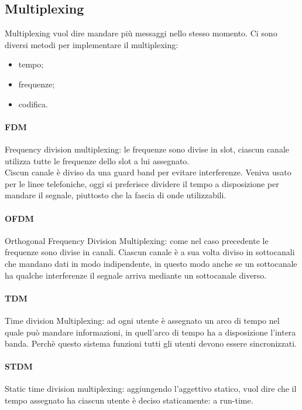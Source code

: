 \documentclass{article}
\begin{document}
\subsection{Multiplexing}
Multiplexing vuol dire mandare più messaggi nello stesso momento.
Ci sono diversi metodi per implementare il multiplexing:
\begin{itemize}
	\item tempo;
	\item frequenze;
	\item codifica.
\end{itemize}

\paragraph{FDM} Frequency division multiplexing: le frequenze sono divise in
slot, ciascun canale utilizza tutte le frequenze dello slot a lui assegnato.\\
Ciscun canale è diviso da una guard band per evitare interferenze. Veniva usato
per le linee telefoniche, oggi si preferisce dividere il tempo a disposizione
per mandare il segnale, piuttosto che la fascia di onde utilizzabili.

\paragraph{OFDM} Orthogonal Frequency Division Multiplexing: come nel caso
precedente le frequenze sono divise in canali. Ciascun canale è a sua volta
diviso in sottocanali che mandano dati in modo indipendente, in questo modo
anche se un sottocanale ha qualche interferenze il segnale arriva mediante un
sottocanale diverso.

\paragraph{TDM} Time division Multiplexing: ad ogni utente è assegnato un arco
di tempo nel quale può mandare informazioni, in quell'arco di tempo ha a
disposizione l'intera banda. Perchè questo sistema funzioni tutti gli utenti
devono essere sincronizzati.

\paragraph{STDM} Static time division multiplexing: aggiungendo l'aggettivo
statico, vuol dire che il tempo assegnato ha ciascun utente è deciso
staticamente: a run-time.
\end{document}
